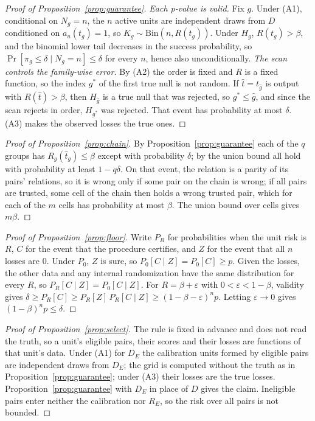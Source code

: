 \documentclass[11pt]{article}
\newcommand{\Bin}{\mathrm{Bin}}
\theoremstyle{definition}
\theoremstyle{remark}
\begin{document}
\begin{proof}[Proof of Proposition~\ref{prop:guarantee}]
\emph{Each p-value is valid.} Fix $g$. Under (A1), conditional on $N_g=n$, the
$n$ active units are independent draws from $D$ conditioned on $a_u(t_g)=1$,
so $K_g\sim\Bin(n,R(t_g))$. Under $H_g$, $R(t_g)>\beta$, and the binomial lower
tail decreases in the success probability, so $\Pr[\pi_g\le\delta\mid
N_g=n]\le\delta$ for every $n$, hence also unconditionally.
\emph{The scan controls the family-wise error.} By (A2) the order is fixed and
$R$ is a fixed function, so the index $g^*$ of the first true null is not
random. If $\hat t=t_{\hat g}$ is output with $R(\hat t)>\beta$, then $H_{\hat
g}$ is a true null that was rejected, so $g^*\le\hat g$, and since the scan
rejects in order, $H_{g^*}$ was rejected. That event has probability at most
$\delta$. (A3) makes the observed losses the true ones.
\end{proof}

\begin{proof}[Proof of Proposition~\ref{prop:chain}]
By Proposition~\ref{prop:guarantee} each of the $q$ groups has
$R_g(\hat t_g)\le\beta$ except with probability $\delta$; by the union bound
all hold with probability at least $1-q\delta$. On that event, the relation
is a parity of its pairs' relations, so it is wrong only if some pair on the
chain is wrong; if all pairs are trusted, some cell of the chain then holds
a wrong trusted pair, which for each of the $m$ cells has probability at
most $\beta$. The union bound over cells gives $m\beta$.
\end{proof}

\begin{proof}[Proof of Proposition~\ref{prop:floor}]
Write $P_R$ for probabilities when the unit risk is $R$, $C$ for the event
that the procedure certifies, and $Z$ for the event that all $n$ losses are
0. Under $P_0$, $Z$ is sure, so $P_0[C\mid Z]=P_0[C]\ge p$. Given the losses,
the other data and any internal randomization have the same distribution
for every $R$, so $P_R[C\mid Z]=P_0[C\mid Z]$. For $R=\beta+\varepsilon$ with
$0<\varepsilon<1-\beta$, validity gives
$\delta\ge P_R[C]\ge P_R[Z]\,P_R[C\mid Z]\ge(1-\beta-\varepsilon)^n p$.
Letting $\varepsilon\to0$ gives $(1-\beta)^np\le\delta$.
\end{proof}

\begin{proof}[Proof of Proposition~\ref{prop:select}]
The rule is fixed in advance and does not read the truth, so a unit's
eligible pairs, their scores and their losses are functions of that unit's
data. Under (A1) for $D_E$ the calibration units formed by eligible pairs
are independent draws from $D_E$; the grid is computed without the truth as
in Proposition~\ref{prop:guarantee}; under (A3) their losses are the true
losses. Proposition~\ref{prop:guarantee} with $D_E$ in place of $D$ gives the
claim. Ineligible pairs enter neither the calibration nor $R_E$, so the risk
over all pairs is not bounded.
\end{proof}
\end{document}
